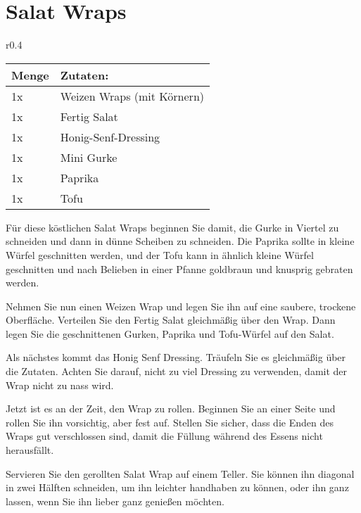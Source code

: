 \documentclass[../../book.tex]{subfiles}
\begin{document}
\section{Salat Wraps}
\begin{wraptable}{r}{0.4\textwidth}
  \centering
  \begin{tabularx}{0.39\textwidth}{|l|X|}
    \midrule
    Menge & Zutaten: \\
    \midrule
    1x & Weizen Wraps (mit Körnern) \\
    \midrule
    1x & Fertig Salat \\
    \midrule
    1x & Honig-Senf-Dressing \\
    \midrule
    1x & Mini Gurke\\
    \midrule
    1x & Paprika\\
    \midrule
    1x & Tofu\\
    \midrule
  \end{tabularx}
\end{wraptable}

Für diese köstlichen Salat Wraps beginnen Sie damit, die Gurke in Viertel zu schneiden und dann in dünne Scheiben zu schneiden. Die Paprika sollte in kleine Würfel geschnitten werden, und der Tofu kann in ähnlich kleine Würfel geschnitten und nach Belieben in einer Pfanne goldbraun und knusprig gebraten werden.

Nehmen Sie nun einen Weizen Wrap und legen Sie ihn auf eine saubere, trockene Oberfläche. Verteilen Sie den Fertig Salat gleichmäßig über den Wrap. Dann legen Sie die geschnittenen Gurken, Paprika und Tofu-Würfel auf den Salat.

Als nächstes kommt das Honig Senf Dressing. Träufeln Sie es gleichmäßig über die Zutaten. Achten Sie darauf, nicht zu viel Dressing zu verwenden, damit der Wrap nicht zu nass wird.

Jetzt ist es an der Zeit, den Wrap zu rollen. Beginnen Sie an einer Seite und rollen Sie ihn vorsichtig, aber fest auf. Stellen Sie sicher, dass die Enden des Wraps gut verschlossen sind, damit die Füllung während des Essens nicht herausfällt.

Servieren Sie den gerollten Salat Wrap auf einem Teller. Sie können ihn diagonal in zwei Hälften schneiden, um ihn leichter handhaben zu können, oder ihn ganz lassen, wenn Sie ihn lieber ganz genießen möchten.

\newpage
\end{document}
